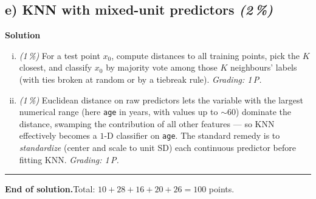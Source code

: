 \documentclass[11pt,a4paper]{article}
\newcommand{\subpoints}[1]{\textit{(#1\,\%)}}
\newcommand{\sol}{\noindent\textbf{Solution}}
\begin{document}
\subsection*{e) KNN with mixed-unit predictors \subpoints{2}}
\sol{}
\begin{enumerate}[(i)]
  \item \subpoints{1} For a test point $x_0$, compute distances to all training points, pick
        the $K$ closest, and classify $x_0$ by majority vote among those $K$ neighbours'
        labels (with ties broken at random or by a tiebreak rule).
        \emph{Grading: 1\,P.}

  \item \subpoints{1} Euclidean distance on raw predictors lets the variable with the largest
        numerical range (here \texttt{age} in years, with values up to $\sim 60$) dominate
        the distance, swamping the contribution of all other features --- so KNN effectively
        becomes a $1$-D classifier on \texttt{age}. The standard remedy is to
        \emph{standardize} (center and scale to unit SD) each continuous predictor before
        fitting KNN.
        \emph{Grading: 1\,P.}
\end{enumerate}

\vspace{1em}
\hrule
\vspace{0.5em}

\noindent\textbf{End of solution.}\quad Total: $10 + 28 + 16 + 20 + 26 = 100$ points.
\end{document}
